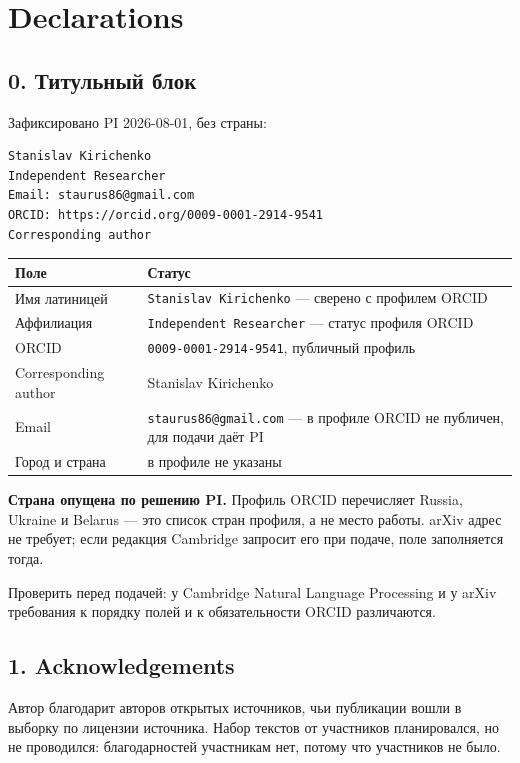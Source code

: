 \documentclass[11pt,a4paper]{article}
\renewcommand{\_}{\textunderscore\allowbreak}
\begin{document}
\section{Declarations}

\subsection{0. Титульный блок}

Зафиксировано PI 2026-08-01, без страны:

\begin{verbatim}
Stanislav Kirichenko
Independent Researcher
Email: staurus86@gmail.com
ORCID: https://orcid.org/0009-0001-2914-9541
Corresponding author
\end{verbatim}

\begin{center}
\small
\begin{tabularx}{\textwidth}{lX}
\toprule
Поле & Статус \\
\midrule
Имя латиницей & \texttt{Stanislav Kirichenko} — сверено с профилем ORCID \\
Аффилиация & \texttt{Independent Researcher} — статус профиля ORCID \\
ORCID & \texttt{0009-\allowbreak{}0001-\allowbreak{}2914-\allowbreak{}9541}, публичный профиль \\
Corresponding author & Stanislav Kirichenko \\
Email & \texttt{staurus86@gmail.com} — в профиле ORCID не публичен, для подачи даёт PI \\
Город и страна & в профиле не указаны \\
\bottomrule
\end{tabularx}
\end{center}

\textbf{Страна опущена по решению PI.} Профиль ORCID перечисляет Russia, Ukraine и
Belarus — это список стран профиля, а не место работы. arXiv адрес не требует;
если редакция Cambridge запросит его при подаче, поле заполняется тогда.

Проверить перед подачей: у Cambridge Natural Language Processing и у arXiv
требования к порядку полей и к обязательности ORCID различаются.

\subsection{1. Acknowledgements}

Автор благодарит авторов открытых источников, чьи публикации вошли в выборку по
лицензии источника. Набор текстов от участников планировался, но не проводился:
благодарностей участникам нет, потому что участников не было.
\end{document}
